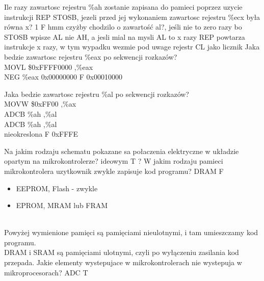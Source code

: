 	\answer
	{Ile razy zawartosc rejestru \%ah zostanie zapisana do pamieci poprzez uzycie instrukcji REP STOSB, jezeli przed jej wykonaniem zawartosc rejestru \%ecx była równa x?}
	{1}
	{F}
	{hmm czyżby chodzilo o zawartość al?, jeśli nie to zero razy bo STOSB wpisze AL nie AH, a jesli mial na mysli AL to x razy}
	{REP powtarza instrukcje x razy, w tym wypadku wezmie pod uwage rejestr CL jako licznik}
	\answer
	{
		Jaka bedzie zawartosc rejestru \%eax po sekwencji rozkazów?\\
		MOVL \$0xFFFF0000 ,\%eax\\
		NEG \%eax
	}
	{0x00000000}
	{F}
	{0x00010000}
	{
		
	}
	\answer
	{Jaka bedzie zawartosc rejestru \%al po sekwencji rozkazów? \\
		MOVW \$0xFF00 ,\%ax\\
		ADCB \%ah ,\%al\\
		ADCB \%ah ,\%al\\
	}
	{nieokreslona}
	{F}
	{0xFFFE}
	{
		
	}
	\answer
	{Na jakim rodzaju schematu pokazane sa połaczenia elektryczne w układzie opartym na mikrokontrolerze?}
	{ideowym}
	{T}
	{?}
	{}
	\answer
	{W jakim rodzaju pamieci mikrokontrolera uzytkownik zwykle zapisuje kod programu?}
	{DRAM}
	{F}
	{
		\begin{itemize}
			\item EEPROM, Flash - zwykle
			\item EPROM, MRAM lub FRAM
		\end{itemize}
	}
	\\{Powyżej wymienione pamięci są pamięciami nieulotnymi, i tam umieszczamy kod programu.\\DRAM i SRAM są pamięciami ulotnymi, czyli po wyłączeniu zasilania kod przepada.}
	\answer
	{Jakie elementy wystepujace w mikrokontrolerach nie wystepuja w mikroprocesorach?}
	{ADC}
	{T}
	{}
